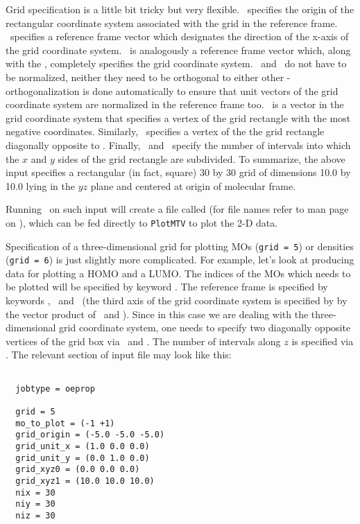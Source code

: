 Grid specification is a little bit tricky but very
flexible. \ specifies the origin of the
rectangular coordinate system associated with the grid in the
reference frame. \ specifies a reference frame
vector which designates the direction of the x-axis of the grid
coordinate system.  \ is analogously a
reference frame vector which, along with the ,
completely specifies the grid coordinate system.
\ and \ do not have to
be normalized, neither they need to be orthogonal to either other -
orthogonalization is done automatically to ensure that unit vectors of
the grid coordinate system are normalized in the reference frame too.
\ is a vector in the grid coordinate system that
specifies a vertex of the grid rectangle with the most negative
coordinates. Similarly, \ specifies a vertex of the
the grid rectangle diagonally opposite to .
Finally, \ and \ specify the number of
intervals into which the $x$ and $y$ sides of the grid rectangle are
subdivided.  To summarize, the above input specifies a rectangular (in
fact, square) 30 by 30 grid of dimensions 10.0 by 10.0 lying in the
$yz$ plane and centered at origin of molecular frame.

Running \PSIthree\ on such input will create a file called
 (for file names refer to man page on \PSIoeprop),
which can be fed directly to {\tt PlotMTV} to plot the 2-D data.

Specification of a three-dimensional grid for plotting MOs
({\tt grid = 5}) or densities ({\tt grid = 6}) is just slightly
more complicated.
For example, let's look at producing data for plotting a HOMO and
a LUMO. The indices of the
MOs which needs to be plotted will be specified by keyword
.
The reference frame is
specified by keywords , \
and \ (the third axis of the grid coordinate
system is specified by by the vector product of
\ and ).  Since in this
case we are dealing with the three-dimensional grid coordinate system,
one needs to specify two diagonally opposite vertices of the grid box
via \keyword{grid\_xyz0}\ and \keyword{grid\_xyz1}.  The number of
intervals along $z$ is specified via \keyword{niz}.  The relevant section of
input file may look like this:
\begin{verbatim}

  jobtype = oeprop

  grid = 5
  mo_to_plot = (-1 +1)
  grid_origin = (-5.0 -5.0 -5.0)
  grid_unit_x = (1.0 0.0 0.0)
  grid_unit_y = (0.0 1.0 0.0)
  grid_xyz0 = (0.0 0.0 0.0)
  grid_xyz1 = (10.0 10.0 10.0)
  nix = 30
  niy = 30
  niz = 30

\end{verbatim}

